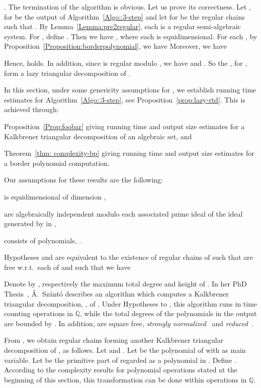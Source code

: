\documentclass{sig-alternate}
\def\Q {\ensuremath{\mathbb{Q}}}
\def\Q {\ensuremath{\mathbb{Q}}}
\begin{document}
\smallskip{}.
The termination of the algorithm is obvious.
Let us prove its correctness.
Let , for  be 
the output of Algorithm~\ref{Algo::3-step} 
and let  for  be the
regular chains such that . 
By Lemma~\ref{Lemma:pre2regular}, each  is a regular semi-algebraic system.
For , define .
Then we have
, 
where each  is equidimensional. 
For each , by Proposition~\ref{Proposition:borderpolynomial}, 
we have 
Moreover, we have 

Hence,
 holds.
In addition, since  is regular modulo , we have
 and . 
So the , for , 
form a lazy triangular decomposition of . 


In this section, under some genericity assumptions for ,
we establish running time estimates for Algorithm~\ref{Algo::3-step},
see Proposition~\ref{prop:lazy-rtd}.
This is achieved through:
\begin{itemizeshort}
\item[   ] Proposition~\ref{Prop:foobar}  
giving running time and output size estimates
for a Kalkbrener triangular decomposition of an algebraic set, and
\item[   ] Theorem~\ref{thm: complexity-bp}
 giving running time and output size estimates
for a border polynomial computation.
\end{itemizeshort}
Our assumptions for these results are the following:
\begin{itemizeshort}
\item[ ]  is equidimensional of dimension ,
\item[ ]  are algebraically independent 
   modulo each associated prime ideal of 
   the ideal generated by  in ,
\item[ ]  consists of  polynomials,
      .
\end{itemizeshort}
Hypotheses  and 
are equivalent to the existence of  
regular chains  of 
such that  are free
w.r.t.\ each of  and such that we have


Denote by ,  respectively 
the maximum total degree and height 
of .
In her PhD Thesis~\cite{Szanto99}, {\'A}.~Sz{\'a}nt{\'o}
describes an algorithm
which computes a Kalkbrener 
triangular decomposition, ,  of .
Under Hypotheses 
to , this algorithm runs in time
 counting operations in {\Q},
while the total degrees of the 
polynomials in the output are bounded by .
In addition,  are square free, 
{\em strongly normalized}~\cite{MMM99} and {\em reduced}~\cite{ALM99}.

From , we obtain 
regular chains  forming another
Kalkbrener triangular decomposition of , as follows.
Let  and .
Let  be the polynomial of  with  as main variable.
Let  be the primitive part of  
regarded as a polynomial in .
Define .
According to the complexity results for polynomial
operations stated at the beginning of this section, 
this transformation can be done 
within  operations in {\Q}.
\end{document}
